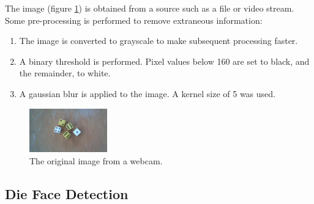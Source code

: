 \documentclass[conference]{IEEEtran}
\begin{document}
The image (figure \ref{fig:original}) is obtained from a source such as a file or video stream.
Some pre-processing is performed to remove extraneous information:
\begin{enumerate}
	\item The image is converted to grayscale to make subsequent processing faster. 
	\item A binary threshold is performed. Pixel values below 160 are set to black, and the remainder, to white.
	\item A gaussian blur is applied to the image. A kernel size of 5 was used.
\end{enumerate}
\begin{figure}
	\centering
	\includegraphics[width=0.3\textwidth]{original}
	\caption{The original image from a webcam.}
	\label{fig:original}
\end{figure}

\subsection{Die Face Detection}
\end{document}
